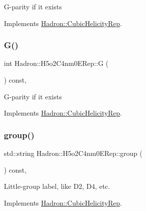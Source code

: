 G-\/parity if it exists 

Implements \mbox{\hyperlink{structHadron_1_1CubicHelicityRep_a50689f42be1e6170aa8cf6ad0597018b}{Hadron\+::\+Cubic\+Helicity\+Rep}}.

\mbox{\label{structHadron_1_1H5o2C4nm0ERep_a9dfac60bb29f12f13f0672f303630db6}} 
\subsubsection{\texorpdfstring{G()}{G()}\hspace{0.1cm}{\footnotesize\ttfamily [2/2]}}
{\footnotesize\ttfamily int Hadron\+::\+H5o2\+C4nm0\+E\+Rep\+::G (\begin{DoxyParamCaption}{ }\end{DoxyParamCaption}) const\hspace{0.3cm}{\ttfamily [inline]}, {\ttfamily [virtual]}}

G-\/parity if it exists 

Implements \mbox{\hyperlink{structHadron_1_1CubicHelicityRep_a50689f42be1e6170aa8cf6ad0597018b}{Hadron\+::\+Cubic\+Helicity\+Rep}}.

\mbox{\label{structHadron_1_1H5o2C4nm0ERep_ab94ac981b014d47f96785b1985df343c}} 
\subsubsection{\texorpdfstring{group()}{group()}\hspace{0.1cm}{\footnotesize\ttfamily [1/2]}}
{\footnotesize\ttfamily std\+::string Hadron\+::\+H5o2\+C4nm0\+E\+Rep\+::group (\begin{DoxyParamCaption}{ }\end{DoxyParamCaption}) const\hspace{0.3cm}{\ttfamily [inline]}, {\ttfamily [virtual]}}

Little-\/group label, like D2, D4, etc. 

Implements \mbox{\hyperlink{structHadron_1_1CubicHelicityRep_a101a7d76cd8ccdad0f272db44b766113}{Hadron\+::\+Cubic\+Helicity\+Rep}}.

\mbox{\label{structHadron_1_1H5o2C4nm0ERep_ab94ac981b014d47f96785b1985df343c}} 
